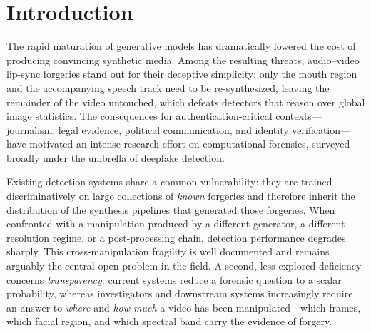 \documentclass[sn-basic,Numbered,referee]{sn-jnl}
\begin{document}

\maketitle

\section{Introduction}
\label{sec:intro}

The rapid maturation of generative models has dramatically lowered the cost of producing convincing synthetic media. Among the resulting threats, audio--video lip-sync forgeries stand out for their deceptive simplicity: only the mouth region and the accompanying speech track need to be re-synthesized, leaving the remainder of the video untouched, which defeats detectors that reason over global image statistics. The consequences for authentication-critical contexts---journalism, legal evidence, political communication, and identity verification---have motivated an intense research effort on computational forensics, surveyed broadly under the umbrella of deepfake detection.

Existing detection systems share a common vulnerability: they are trained discriminatively on large collections of \emph{known} forgeries and therefore inherit the distribution of the synthesis pipelines that generated those forgeries. When confronted with a manipulation produced by a different generator, a different resolution regime, or a post-processing chain, detection performance degrades sharply. This cross-manipulation fragility is well documented and remains arguably the central open problem in the field. A second, less explored deficiency concerns \emph{transparency}: current systems reduce a forensic question to a scalar probability, whereas investigators and downstream systems increasingly require an answer to \textit{where} and \textit{how much} a video has been manipulated---which frames, which facial region, and which spectral band carry the evidence of forgery.
\end{document}
